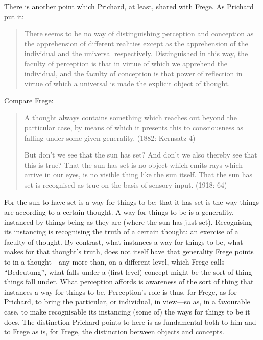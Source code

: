 There is another point which Prichard, at least, shared with Frege. As Prichard put it:
\begin{quote}
	There seems to be no way of distinguishing perception and conception as the apprehension of different realities except as the apprehension of the individual and the universal respectively. Distinguished in this way, the faculty of perception is that in virtue of which we apprehend the individual, and the faculty of conception is that power of reflection in virtue of which a universal is made the explicit object of thought. \citep[44]{Prichard:1909yg}
\end{quote}
Compare Frege:
\begin{quote}
	\noindent A thought always contains something which reaches out beyond the particular case, by means of which it presents this to consciousness as falling under some given generality. (1882: Kernsatz 4)
	
	\noindent But don’t we see that the sun has set? And don’t we also thereby see that this is true? That the sun has set is no object which emits rays which arrive in our eyes, is no visible thing like the sun itself. That the sun has set is recognised as true on the basis of sensory input. (1918: 64)
\end{quote}
For the sun to have set is a way for things to be; that it has set is the way things are according to a certain thought. A way for things to be is a generality, instanced by things being as they are (where the sun has just set). Recognising its instancing is recognising the truth of a certain thought; an exercise of a faculty of thought. By contrast, what instances a way for things to be, what makes for that thought's truth, does not itself have that generality Frege points to in a thought---any more than, on a different level, which Frege calls ``Bedeutung'', what falls under a (first-level) concept might be the sort of thing things fall under. What perception affords is awareness of the sort of thing that instances a way for things to be. Perception's role is thus, for Frege, as for Prichard, to bring the particular, or individual, in view---so as, in a favourable case, to make recognisable its instancing (some of) the ways for things to be it does. The distinction Prichard points to here is as fundamental both to him and to Frege as is, for Frege, the distinction between objects and concepts.

